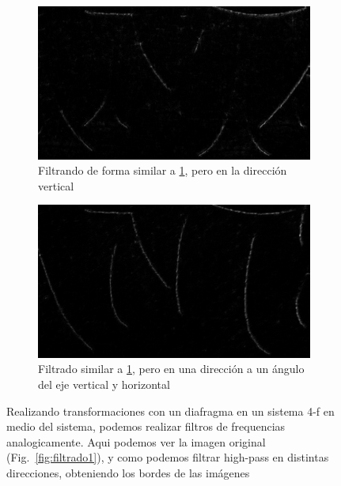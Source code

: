 \documentclass{./packages/optica-article}
\begin{document}
\begin{figure}[hptb]
\begin{center}
\begin{subfigure}[t]{0.45\textwidth}
			\label{fig:filtrado2}
		\end{subfigure}
		\begin{subfigure}[t]{0.45\textwidth}\centering
			\includegraphics[width=\textwidth]{parte4-filtrado/4f-pic-2ocm-diafragm-10cm-camera-letters-high-frequency-dot-down.png}
			\caption{Filtrando de forma similar a \ref{fig:filtrado2}, pero en la dirección vertical}
			\label{fig:filtrado3}
		\end{subfigure}
		\quad
		\begin{subfigure}[t]{0.45\textwidth}\centering
			\includegraphics[width=\textwidth]{parte4-filtrado/4f-pic-2ocm-diafragm-10cm-camera-letters-high-frequency-dot-right-a-bit-down.png}
			\caption{Filtrado similar a \ref{fig:filtrado2}, pero en una dirección a un ángulo del eje vertical y horizontal}
		\end{subfigure}
		\caption{Realizando transformaciones con un diafragma en un sistema 4-f en medio del sistema, podemos realizar filtros de frequencias analogicamente. Aqui podemos ver la imagen original (Fig.~\ref{fig:filtrado1}), y como podemos filtrar high-pass en distintas direcciones, obteniendo los bordes de las imágenes}
		\label{fig:filtrado:all}
	\end{center}
\end{figure}
\end{document}
